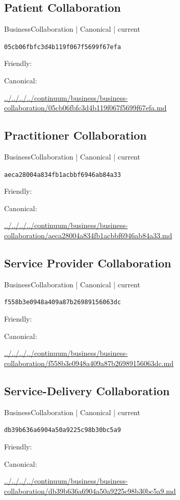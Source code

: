 \documentclass[10pt,a4paper]{article}
\begin{document}
\subsection*{Patient Collaboration}
{\small BusinessCollaboration | Canonical | current}\par
\texttt{05cb06fbfc3d4b119f067f5699f67efa}\par
Friendly: \par
Canonical: \par
{\footnotesize\url{../../../../continuum/business/business-collaboration/05cb06fbfc3d4b119f067f5699f67efa.md}}\par
\subsection*{Practitioner Collaboration}
{\small BusinessCollaboration | Canonical | current}\par
\texttt{aeca28004a834fb1acbbf6946ab84a33}\par
Friendly: \par
Canonical: \par
{\footnotesize\url{../../../../continuum/business/business-collaboration/aeca28004a834fb1acbbf6946ab84a33.md}}\par
\subsection*{Service Provider Collaboration}
{\small BusinessCollaboration | Canonical | current}\par
\texttt{f558b3e0948a409a87b26989156063dc}\par
Friendly: \par
Canonical: \par
{\footnotesize\url{../../../../continuum/business/business-collaboration/f558b3e0948a409a87b26989156063dc.md}}\par
\subsection*{Service-Delivery Collaboration}
{\small BusinessCollaboration | Canonical | current}\par
\texttt{db39b636a6904a50a9225c98b30bc5a9}\par
Friendly: \par
Canonical: \par
{\footnotesize\url{../../../../continuum/business/business-collaboration/db39b636a6904a50a9225c98b30bc5a9.md}}\par
\end{document}
